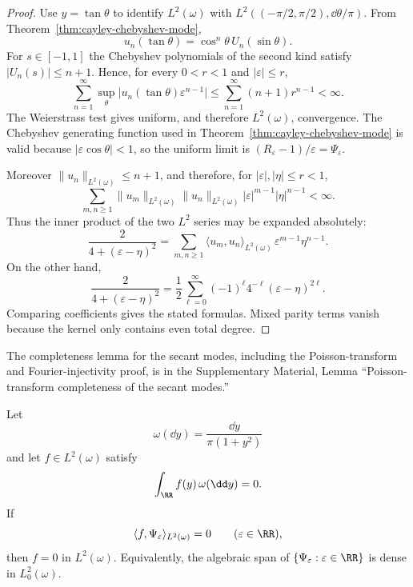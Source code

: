 \begin{proof}
Use $y=\tan\theta$ to identify $L^2(\omega)$ with
$L^2((-\pi/2,\pi/2),\dd\theta/\pi)$.  From
Theorem~\ref{thm:cayley-chebyshev-mode},
\[
u_n(\tan\theta)=\cos^n\theta\,U_n(\sin\theta).
\]
For $s\in[-1,1]$ the Chebyshev polynomials of the second kind satisfy
$|U_n(s)|\le n+1$.  Hence, for every $0<r<1$ and
$|\varepsilon|\le r$,
\[
\sum_{n=1}^{\infty}
\sup_{\theta}\bigl|u_n(\tan\theta)\varepsilon^{n-1}\bigr|
\le
\sum_{n=1}^{\infty}(n+1)r^{n-1}<\infty.
\]
The Weierstrass test gives uniform, and therefore $L^2(\omega)$,
convergence.  The Chebyshev generating function used in
Theorem~\ref{thm:cayley-chebyshev-mode} is valid because
$|\varepsilon\cos\theta|<1$, so the uniform limit is
$(R_\varepsilon-1)/\varepsilon=\Psi_\varepsilon$.

Moreover $\|u_n\|_{L^2(\omega)}\le n+1$, and therefore, for
$|\varepsilon|,|\eta|\le r<1$,
\[
\sum_{m,n\ge1}
\|u_m\|_{L^2(\omega)}\|u_n\|_{L^2(\omega)}
|\varepsilon|^{m-1}|\eta|^{n-1}<\infty.
\]
Thus the inner product of the two $L^2$ series may be expanded
absolutely:
\[
\frac{2}{4+(\varepsilon-\eta)^2}
=\sum_{m,n\ge 1}
\langle u_m,u_n\rangle_{L^2(\omega)}\,
\varepsilon^{m-1}\eta^{n-1}.
\]
On the other hand,
\[
\frac{2}{4+(\varepsilon-\eta)^2}
=\frac12\sum_{\ell=0}^{\infty}
(-1)^\ell 4^{-\ell}(\varepsilon-\eta)^{2\ell}.
\]
Comparing coefficients gives the stated formulas.  Mixed parity terms
vanish because the kernel only contains even total degree.
\end{proof}
\fi

\ifdefined\JFAArticleMain
The completeness lemma for the secant modes, including the Poisson-transform
and Fourier-injectivity proof, is in the Supplementary Material, Lemma
``Poisson-transform completeness of the secant modes.''
\else
\begin{lemma}%
\label{lem:poisson-injectivity-weighted}
Let
\[
\omega(\dd y)=\frac{\dd y}{\pi(1+y^2)}
\]
and let \(f\in L^2(\omega)\) satisfy
\[
\int_{\RR}f(y)\,\omega(\dd y)=0 .
\]
If
\[
\langle f,\Psi_\varepsilon\rangle_{L^2(\omega)}=0
\qquad(\varepsilon\in\RR),
\]
then \(f=0\) in \(L^2(\omega)\).  Equivalently, the algebraic span of
\(\{\Psi_\varepsilon:\varepsilon\in\RR\}\) is dense in \(L^2_0(\omega)\).
\end{lemma}


